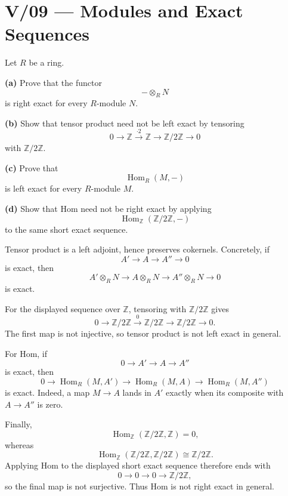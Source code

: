 \section*{V/09 --- Modules and Exact Sequences}

\begin{problem}[CP-V-0024]
\label{prob:cp-v-0024}
Let \(R\) be a ring.

\textbf{(a)} Prove that the functor
\[
-\otimes_R N
\]
is right exact for every \(R\)-module \(N\).

\textbf{(b)} Show that tensor product need not be left exact by tensoring
\[
0\longrightarrow\mathbb Z
\xrightarrow{\cdot2}
\mathbb Z
\longrightarrow
\mathbb Z/2\mathbb Z
\longrightarrow0
\]
with \(\mathbb Z/2\mathbb Z\).

\textbf{(c)} Prove that
\[
\operatorname{Hom}_R(M,-)
\]
is left exact for every \(R\)-module \(M\).

\textbf{(d)} Show that Hom need not be right exact by applying
\[
\operatorname{Hom}_{\mathbb Z}(\mathbb Z/2\mathbb Z,-)
\]
to the same short exact sequence.
\end{problem}

\begin{solution}
Tensor product is a left adjoint, hence preserves cokernels. Concretely, if
\[
A'\longrightarrow A\longrightarrow A''\longrightarrow0
\]
is exact, then
\[
A'\otimes_RN
\longrightarrow
A\otimes_RN
\longrightarrow
A''\otimes_RN
\longrightarrow0
\]
is exact.

For the displayed sequence over \(\mathbb Z\), tensoring with
\(\mathbb Z/2\mathbb Z\) gives
\[
0\longrightarrow
\mathbb Z/2\mathbb Z
\xrightarrow{0}
\mathbb Z/2\mathbb Z
\longrightarrow
\mathbb Z/2\mathbb Z
\longrightarrow0.
\]
The first map is not injective, so tensor product is not left exact in
general.

For Hom, if
\[
0\longrightarrow A'\longrightarrow A\longrightarrow A''
\]
is exact, then
\[
0\longrightarrow
\operatorname{Hom}_R(M,A')
\longrightarrow
\operatorname{Hom}_R(M,A)
\longrightarrow
\operatorname{Hom}_R(M,A'')
\]
is exact. Indeed, a map \(M\to A\) lands in \(A'\) exactly when its composite
with \(A\to A''\) is zero.

Finally,
\[
\operatorname{Hom}_{\mathbb Z}(\mathbb Z/2\mathbb Z,\mathbb Z)=0,
\]
whereas
\[
\operatorname{Hom}_{\mathbb Z}
(\mathbb Z/2\mathbb Z,\mathbb Z/2\mathbb Z)
\cong
\mathbb Z/2\mathbb Z.
\]
Applying Hom to the displayed short exact sequence therefore ends with
\[
0\longrightarrow0\longrightarrow0
\longrightarrow
\mathbb Z/2\mathbb Z,
\]
so the final map is not surjective. Thus Hom is not right exact in general.
\end{solution}


